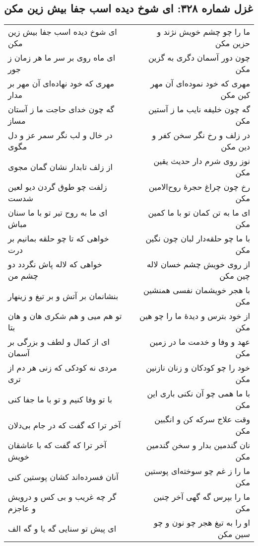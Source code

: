 \begin{center}
\section*{غزل شماره ۳۲۸: ای شوخ دیده اسب جفا بیش زین مکن}
\label{sec:328}
\begin{longtable}{l p{0.5cm} r}
ای شوخ دیده اسب جفا بیش زین مکن
&&
ما را چو چشم خویش نژند و حزین مکن
\\
ای ماه روی بر سر ما هر زمان ز جور
&&
چون دور آسمان دگری به گزین مکن
\\
مهری که خود نهاده‌ای آن مهر بر مدار
&&
مهری که خود نموده‌ای آن مهر کین مکن
\\
گه چون خدای حاجت ما ز آستان مساز
&&
گه چون خلیفه نایب ما ز آستین مکن
\\
در خال و لب نگر سمر عز و دل مگوی
&&
در زلف و رخ نگر سخن کفر و دین مکن
\\
از زلف تابدار نشان گمان مجوی
&&
نوز روی شرم دار حدیث یقین مکن
\\
زلفت چو طوق گردن دیو لعین شدست
&&
رخ چون چراغ حجرهٔ روح‌الامین مکن
\\
ای ما به روح تیر تو با ما سنان مباش
&&
ای ما به تن کمان تو با ما کمین مکن
\\
خواهی که تا چو حلقه بمانیم بر درت
&&
با ما چو حلقه‌دار لبان چون نگین مکن
\\
خواهی که لاله پاش نگردد دو چشم من
&&
از روی خویش چشم خسان لاله چین مکن
\\
بنشانمان بر آتش و بر تیغ و زینهار
&&
با هجر خویشمان نفسی همنشین مکن
\\
تو هم میی و هم شکری هان و هان بتا
&&
از خود بترس و دیدهٔ ما را چو هین مکن
\\
ای از کمال و لطف و بزرگی بر آسمان
&&
عهد و وفا و خدمت ما در زمین مکن
\\
مردی نه کودکی که زنی هر دم از تری
&&
خود را چو کودکان و زنان نازنین مکن
\\
با تو وفا کنیم و تو با ما جفا کنی
&&
با ما همی چو آن نکنی باری این مکن
\\
آخر ترا که گفت که در جام بی‌دلان
&&
وقت علاج سرکه کن و انگبین مکن
\\
آخر ترا که گفت که با عاشقان خویش
&&
نان گندمین بدار و سخن گندمین مکن
\\
آنان فسرده‌اند کشان پوستین کنی
&&
ما را ز غم چو سوخته‌ای پوستین مکن
\\
گر چه غریب و بی کس و درویش و عاجزم
&&
ما را بپرس گه گهی آخر چنین مکن
\\
ای پیش تو سنایی گه یا و گه الف
&&
او را به تیغ هجر چو نون و چو سین مکن
\\
\end{longtable}
\end{center}
